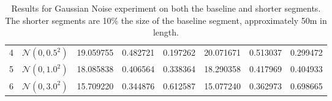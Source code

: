 \begin{table}[ht]
\begin{tabular}{l l | C{2.2} C{1.3} C{1.3} | C{2.2} C{1.3} C{1.3}}
4 & $\mathcal{N}(0, 0.5^2)$ & 19.059755 & 0.482721 & 0.197262 & 20.071671 & 0.513037 & 0.299472 \\ 
5 & $\mathcal{N}(0, 1.0^2)$ & 18.085838 & 0.406564 & 0.338364 & 18.290358 & 0.417969 & 0.404933 \\ 
6 & $\mathcal{N}(0, 3.0^2)$ & 15.709220 & 0.344876 & 0.612587 & 15.077240 & 0.362973 & 0.698665 \\ 
\hline
\end{tabular}
\caption{Results for Gaussian Noise experiment on both the baseline and shorter segments. The shorter segments are 10\% the size of the baseline segment, approximately 50m in length.}
\label{tab:exp-gaussian-noise}
\end{table}

\begin{comment}
\begin{table}[H]
\centering
\setlength{\tabcolsep}{6pt}
\renewcommand{\arraystretch}{1.5}
\begin{tabular}{l l | C{2.2} C{1.3} C{1.3}}
\hline
& \textbf{Description} & \textbf{PSNR $\uparrow$} & \textbf{SSIM $\uparrow$} & \textbf{LPIPS $\downarrow$} \\
\hline
\multicolumn{5}{c}{\textbf{Baseline \textbf{with} camera optimizer}} \\
\hline
0 & $\mathcal{N}(0, 0.0)$   & \cellcolor{green} 23.412970 & \cellcolor{green} 0.713507 & \cellcolor{red} 0.320640 \\
1 & $\mathcal{N}(0, 0.1^2)$ & 22.513981 & 0.674136 & 0.321364 \\
2 & $\mathcal{N}(0, 0.2^2)$ & 21.343519 & 0.616709 & 0.338266 \\
3 & $\mathcal{N}(0, 0.3^2)$ & 20.520330 & 0.577203 & 0.345663 \\
4 & $\mathcal{N}(0, 0.5^2)$ & 19.075649 & 0.501499 & 0.371572 \\
5 & $\mathcal{N}(0, 1.0^2)$ & 17.670620 & 0.433909 & 0.432940 \\
6 & $\mathcal{N}(0, 3.0^2)$ & \cellcolor{red} 16.662760 & \cellcolor{red} 0.408036 & \cellcolor{green} 0.637326 \\
\hline
\multicolumn{5}{c}{\textbf{Baseline \textbf{without} camera optimizer}} \\
\hline
0 & $\mathcal{N}(0, 0.0)$   & \cellcolor{green} 24.702831 & \cellcolor{green} 0.792646 & \cellcolor{red} 0.179289 \\
1 & $\mathcal{N}(0, 0.1^2)$ & 22.463675 & 0.677371 & 0.280633 \\
2 & $\mathcal{N}(0, 0.2^2)$ & 21.212559 & 0.601917 & 0.366598 \\

\end{comment}
